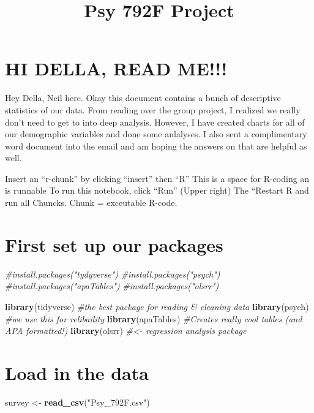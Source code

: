 \documentclass[]{article}
\title{Psy 792F Project}
\author{}
\date{}
\newenvironment{Shaded}{\begin{snugshade}}{\end{snugshade}}
\newcommand{\KeywordTok}[1]{\textcolor[rgb]{0.13,0.29,0.53}{\textbf{#1}}}
\newcommand{\StringTok}[1]{\textcolor[rgb]{0.31,0.60,0.02}{#1}}
\newcommand{\CommentTok}[1]{\textcolor[rgb]{0.56,0.35,0.01}{\textit{#1}}}
\newcommand{\NormalTok}[1]{#1}
\begin{document}
\maketitle

{
\setcounter{tocdepth}{2}
\tableofcontents
}
\section{HI DELLA, READ ME!!!}\label{hi-della-read-me}

Hey Della, Neil here. Okay this document contains a bunch of descriptive
statistics of our data. From reading over the group project, I realized
we really don't need to get to into deep analysis. However, I have
created charts for all of our demographic variables and done some
anlalyses. I also sent a complimentary word document into the email and
am hoping the answers on that are helpful as well.

Insert an ``r-chunk'' by clicking ``insert'' then ``R'' This is a space
for R-coding an is runnable To run this notebook, click ``Run'' (Upper
right) The ``Restart R and run all Chuncks. Chunk = exceutable R-code.

\section{First set up our packages}\label{first-set-up-our-packages}

\begin{Shaded}
\begin{Highlighting}[]
\CommentTok{#install.packages("tydyverse")}
\CommentTok{#install.packages("psych")}
\CommentTok{#install.packages("apaTables")}
\CommentTok{#install.packages("olsrr")}

\KeywordTok{library}\NormalTok{(tidyverse) }\CommentTok{#the best package for reading & cleaning data}
\KeywordTok{library}\NormalTok{(psych) }\CommentTok{#we use this for relibaility}
\KeywordTok{library}\NormalTok{(apaTables) }\CommentTok{#Creates really cool tables (and APA formatted!)}
\KeywordTok{library}\NormalTok{(olsrr) }\CommentTok{#<- regression analysis package}
\end{Highlighting}
\end{Shaded}

\section{Load in the data}\label{load-in-the-data}

\begin{Shaded}
\begin{Highlighting}[]
\NormalTok{survey <-}\StringTok{ }\KeywordTok{read_csv}\NormalTok{(}\StringTok{"Psy_792F.csv"}\NormalTok{)}
\end{Highlighting}
\end{Shaded}
\end{document}
